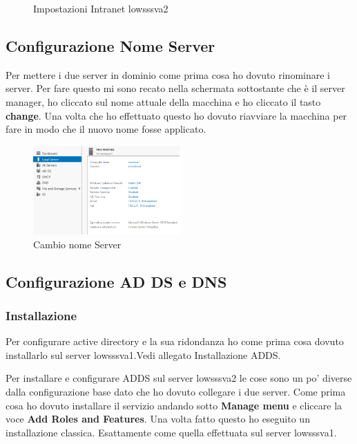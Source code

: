 \documentclass[../main.tex]{subfiles}
\begin{document}
\begin{figure}[h]
\begin{minipage}[h]{0.4\textwidth}
    \caption{Impostazioni Intranet lowsssva2}
  \end{minipage}
\end{figure}




\subsection{Configurazione Nome Server}
Per mettere i due server in dominio come prima cosa ho dovuto rinominare i server. Per fare questo mi sono recato nella schermata sottostante che è il server manager, ho cliccato sul nome attuale della macchina e ho cliccato il tasto \textbf{change}. Una volta che ho effettuato questo ho dovuto riavviare la macchina per fare in modo che il nuovo nome fosse applicato.

 \begin{figure}[h]
    \centering
    \includegraphics[width=0.5\textwidth]{Images/nomeServer.PNG}
    \caption{Cambio nome Server}
\end{figure}


\pagebreak{}
\thispagestyle{header-pages}

\subsection{Configurazione AD DS e DNS}

\subsubsection{Installazione}
Per configurare active directory e la sua ridondanza ho come prima cosa dovuto installarlo sul server lowsssva1.Vedi allegato Installazione ADDS.

Per installare e configurare ADDS sul server lowsssva2 le cose sono un po' diverse dalla configurazione base dato che ho dovuto collegare i due server. Come prima cosa ho dovuto installare il servizio andando sotto \textbf{Manage menu} e cliccare la voce \textbf{Add Roles and Features}.  Una volta fatto questo ho eseguito un installazione classica. Esattamente come quella effettuata sul server lowsssva1.
\end{document}

